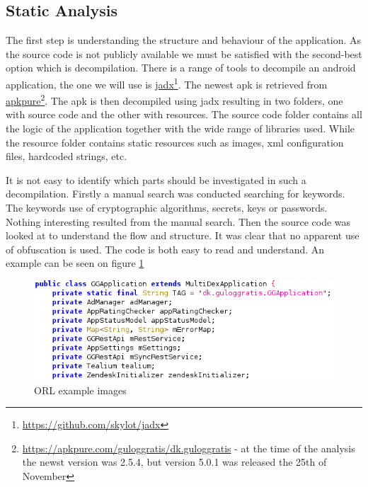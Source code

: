\subsection{Static Analysis}
The first step is understanding the structure and behaviour of the application. As the source code is not publicly available we must be satisfied with the second-best option which is decompilation. There is a range of tools to decompile an android application, the one we will use is \href{https://github.com/skylot/jadx}{jadx}\footnote{\href{https://github.com/skylot/jadx}{https://github.com/skylot/jadx}}. The newest apk is retrieved from \href{https://apkpure.com/guloggratis/dk.guloggratis}{apkpure}\footnote{\href{https://apkpure.com/guloggratis/dk.guloggratis}{https://apkpure.com/guloggratis/dk.guloggratis} - at the time of the analysis the newst version was 2.5.4, but version 5.0.1 was released the 25th of November}. The apk is then decompiled using jadx resulting in two folders, one with source code and the other with resources. The source code folder contains all the logic of the application together with the wide range of libraries used. While the resource folder contains static resources such as images, xml configuration files, hardcoded strings, etc.

It is not easy to identify which parts should be investigated in such a decompilation. Firstly a manual search was conducted searching for keywords. The keywords use of cryptographic algorithms, secrets, keys or passwords. Nothing interesting resulted from the manual search. Then the source code  was looked at to understand the flow and structure. It was clear that no apparent use of obfuscation is used. The code is both easy to read and understand. An example can be seen on figure \ref{fig:ggapplication-properties} 

\begin{figure}[htbp]
    \centering
    \includegraphics[width=1\columnwidth]{../static-analysis/pictures/GGApplication_properties.png}
    \caption{ORL example images}
    \label{fig:ggapplication-properties}
\end{figure}

